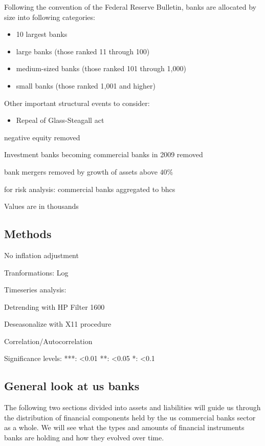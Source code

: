\documentclass[12pt, a4paper]{article} %
\begin{document}
Following the convention of the Federal Reserve Bulletin, banks are allocated by size into following categories:
\begin{itemize}
 \item 10 largest banks
 \item large banks (those ranked
  11 through 100)
 \item medium-sized banks (those ranked 101 through
 1,000)
 \item small banks (those ranked 1,001 and higher)
 \end{itemize} 

Other important structural events to consider:
\begin{itemize}
\item Repeal of Glass-Steagall act 
\end{itemize}

negative equity removed

Investment banks becoming commercial banks in 2009 removed

bank mergers removed by growth of assets above $40\%$

for risk analysis: commercial banks aggregated to bhcs

Values are in thousands

\subsection{Methods}


No inflation adjustment

Tranformations: Log

Timeseries analysis:

Detrending with HP Filter 1600

Deseasonalize with X11 procedure

Correlation/Autocorrelation

Significance levels: ***: <0.01
					**: <0.05
					*: <0.1



\subsection{General look at us banks}

The following two sections divided into assets and liabilities will guide us through the distribution of financial components held by the us commercial banks sector as a whole. We will see what the types and amounts of financial instruments banks are holding and how they evolved over time. 
\end{document}
